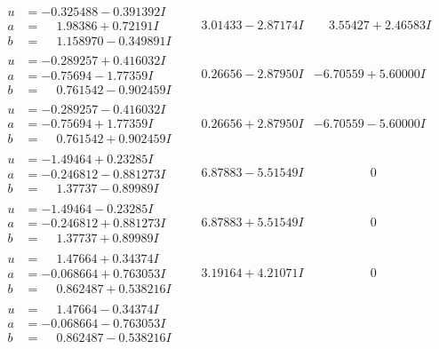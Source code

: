 \documentclass[1p]{elsarticle_modified}
\theoremstyle{definition}
\begin{document}
$$\begin{array}{c|c|c}
\begin{aligned}
u &= -0.325488 - 0.391392 I \\
a &= \phantom{-}1.98386 + 0.72191 I \\
b &= \phantom{-}1.158970 - 0.349891 I\end{aligned}
 & \phantom{-}3.01433 - 2.87174 I & \phantom{-}3.55427 + 2.46583 I \\ \hline\begin{aligned}
u &= -0.289257 + 0.416032 I \\
a &= -0.75694 - 1.77359 I \\
b &= \phantom{-}0.761542 - 0.902459 I\end{aligned}
 & \phantom{-}0.26656 - 2.87950 I & -6.70559 + 5.60000 I \\ \hline\begin{aligned}
u &= -0.289257 - 0.416032 I \\
a &= -0.75694 + 1.77359 I \\
b &= \phantom{-}0.761542 + 0.902459 I\end{aligned}
 & \phantom{-}0.26656 + 2.87950 I & -6.70559 - 5.60000 I \\ \hline\begin{aligned}
u &= -1.49464 + 0.23285 I \\
a &= -0.246812 - 0.881273 I \\
b &= \phantom{-}1.37737 - 0.89989 I\end{aligned}
 & \phantom{-}6.87883 - 5.51549 I & \phantom{-0.000000 } 0 \\ \hline\begin{aligned}
u &= -1.49464 - 0.23285 I \\
a &= -0.246812 + 0.881273 I \\
b &= \phantom{-}1.37737 + 0.89989 I\end{aligned}
 & \phantom{-}6.87883 + 5.51549 I & \phantom{-0.000000 } 0 \\ \hline\begin{aligned}
u &= \phantom{-}1.47664 + 0.34374 I \\
a &= -0.068664 + 0.763053 I \\
b &= \phantom{-}0.862487 + 0.538216 I\end{aligned}
 & \phantom{-}3.19164 + 4.21071 I & \phantom{-0.000000 } 0 \\ \hline\begin{aligned}
u &= \phantom{-}1.47664 - 0.34374 I \\
a &= -0.068664 - 0.763053 I \\
b &= \phantom{-}0.862487 - 0.538216 I\end{aligned}

\end{array}$$
\end{document}
